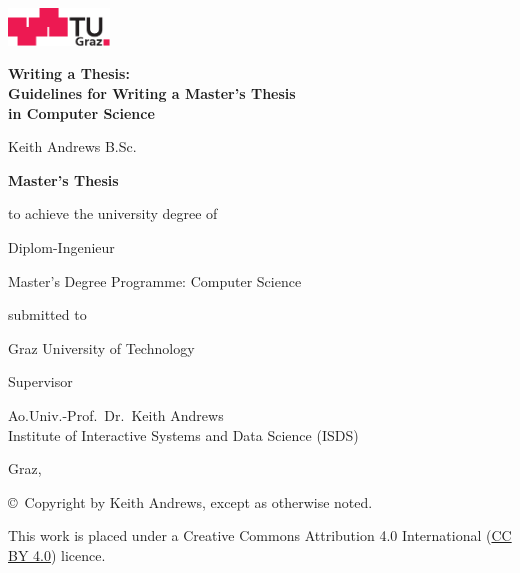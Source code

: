 \begin{center}
\includegraphics[height=1cm]{diagrams/tugraz-logo.pdf}

\vspace{2cm}

\begin{spacing}{1.1}
\huge\sffamily\bfseries
Writing a Thesis:\\
Guidelines for Writing a Master's Thesis\\
in Computer Science
\end{spacing}

\vspace{2cm}

{\Large\sffamily Keith Andrews B.Sc.}

\vspace{2cm}

{\Large\sffamily\bfseries Master's Thesis}

\vspace{5mm}

{\small\sffamily to achieve the university degree of}

\vspace{5mm}

{\normalsize\sffamily Diplom-Ingenieur}

\vspace{5mm}

{\normalsize\sffamily
Master's Degree Programme: Computer Science
}


\vspace{1cm}

{\small\sffamily submitted to}

\vspace{5mm}

{\large\sffamily Graz University of Technology}



\vspace{1cm}

{\small\sffamily Supervisor}

\vspace{5mm}

{\normalsize\sffamily
Ao.Univ.-Prof.\ Dr.\ Keith Andrews \\
Institute of Interactive Systems and Data Science (ISDS)
}


\vspace{1cm}

{\normalsize\sffamily Graz, \thisdate}



\vfill

{\footnotesize\sffamily \copyright~Copyright \thisyear{} by Keith Andrews,
except as otherwise noted.}

{\footnotesize\sffamily This work is placed under a
Creative Commons Attribution 4.0 International
(\href{https://creativecommons.org/licenses/by/4.0/}{CC BY 4.0}) licence.}


\end{center}




